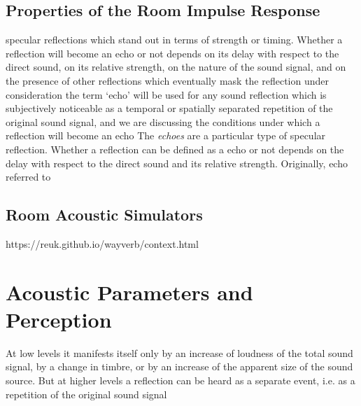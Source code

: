 \subsection{Properties of the Room Impulse Response}
 specular reflections which stand out in terms of strength or timing.
Whether a reflection will become an echo or not depends on its delay with respect to the direct sound, on its relative strength, on the nature of the sound signal, and on the presence of other reflections which eventually mask the reflection under consideration
the term ‘echo’ will be used for any sound reflection which
is subjectively noticeable as a temporal or spatially separated repetition of the original sound signal, and we are discussing the conditions under which a reflection will become an echo
The \textit{echoes} are a particular type of specular reflection.
Whether a reflection can be defined as a echo or not depends
on the delay with respect to the direct sound and its relative strength.
Originally, echo referred to



\subsection{Room Acoustic Simulators}
https://reuk.github.io/wayverb/context.html

\section{Acoustic Parameters and Perception}
At low levels it manifests itself only by an increase of loudness of the total sound signal, by a change in timbre, or by an increase of the apparent size of the sound source. But at higher levels a reflection can be heard as a separate event, i.e. as a repetition of the original sound signal
